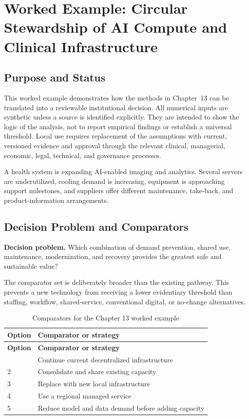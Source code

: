 \section{Worked Example: Circular Stewardship of AI Compute and Clinical Infrastructure}
\label{sec:comp-ch13-worked-example}

\subsection{Purpose and Status}
This worked example demonstrates how the methods in Chapter~13 can be
translated into a reviewable institutional decision. All numerical inputs are
synthetic unless a source is identified explicitly. They are intended to show the
logic of the analysis, not to report empirical findings or establish a universal
threshold. Local use requires replacement of the assumptions with current,
versioned evidence and approval through the relevant clinical, managerial,
economic, legal, technical, and governance processes.

A health system is expanding AI-enabled imaging and analytics. Several servers are underutilized, cooling demand is increasing, equipment is approaching support milestones, and suppliers offer different maintenance, take-back, and product-information arrangements. 

\subsection{Decision Problem and Comparators}
\textbf{Decision problem.} Which combination of demand prevention, shared use, maintenance, modernization, and recovery provides the greatest safe and sustainable value?

The comparator set is deliberately broader than the existing pathway. This prevents
a new technology from receiving a lower evidentiary threshold than staffing,
workflow, shared-service, conventional digital, or no-change alternatives.

\begin{longtable}{@{}p{}p{}@{}}
\caption{Comparators for the Chapter 13 worked example}
\label{tab:comp-ch13-comparators}\\
\toprule
\textbf{Option} & \textbf{Comparator or strategy} \\
\midrule
\endfirsthead
\toprule
\textbf{Option} & \textbf{Comparator or strategy} \\
\midrule
\endhead
\bottomrule
\endlastfoot
1 & Continue current decentralized infrastructure \\
2 & Consolidate and share existing capacity \\
3 & Replace with new local infrastructure \\
4 & Use a regional managed service \\
5 & Reduce model and data demand before adding capacity \\
\end{longtable}

